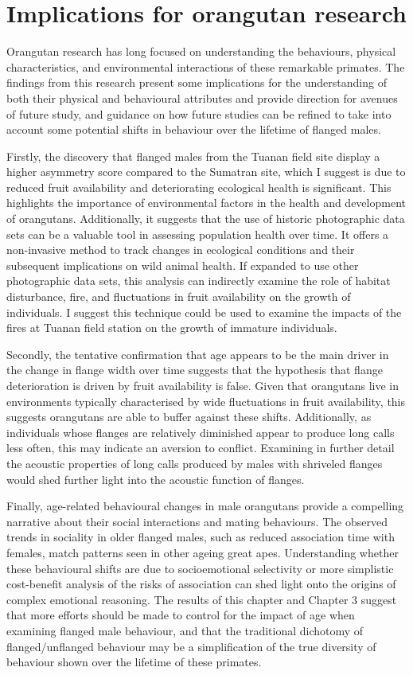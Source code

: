 \section{Implications for orangutan research}

Orangutan research has long focused on understanding the behaviours, physical characteristics, and environmental interactions of these remarkable primates. The findings from this research present some implications for the understanding of both their physical and behavioural attributes and provide direction for avenues of future study, and guidance on how future studies can be refined to take into account some potential shifts in behaviour over the lifetime of flanged males.

Firstly, the discovery that flanged males from the Tuanan field site display a higher asymmetry score compared to the Sumatran site, which I suggest is due to reduced fruit availability and deteriorating ecological health is significant. This highlights the importance of environmental factors in the health and development of orangutans. Additionally, it suggests that the use of historic photographic data sets can be a valuable tool in assessing population health over time. It offers a non-invasive method to track changes in ecological conditions and their subsequent implications on wild animal health. If expanded to use other photographic data sets, this analysis can indirectly examine the role of habitat disturbance, fire, and fluctuations in fruit availability on the growth of individuals. I suggest this technique could be used to examine the impacts of the fires at Tuanan field station on the growth of immature individuals.

Secondly, the tentative confirmation that age appears to be the main driver in the change in flange width over time suggests that the hypothesis that flange deterioration is driven by fruit availability is false. Given that orangutans live in environments typically characterised by wide fluctuations in fruit availability, this suggests orangutans are able to buffer against these shifts. Additionally, as individuals whose flanges are relatively diminished appear to produce long calls less often, this may indicate an aversion to conflict. Examining in further detail the acoustic properties of long calls produced by males with shriveled flanges would shed further light into the acoustic function of flanges. 

Finally, age-related behavioural changes in male orangutans provide a compelling narrative about their social interactions and mating behaviours. The observed trends in sociality in older flanged males, such as reduced association time with females, match patterns seen in other ageing great apes. Understanding whether these behavioural shifts are due to socioemotional selectivity or more simplistic cost-benefit analysis of the risks of association can shed light onto the origins of complex emotional reasoning. The results of this chapter and Chapter 3 suggest that more efforts should be made to control for the impact of age when examining flanged male behaviour, and that the traditional dichotomy of flanged/unflanged behaviour may be a simplification of the true diversity of behaviour shown over the lifetime of these primates.

